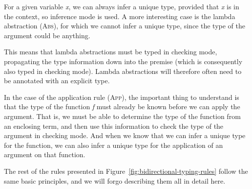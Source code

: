 \begin{figure}
\begin{center}
\usebox{\ptone}
\end{center}
\end{figure}
For a given variable \textit{x}, we can always infer a unique type, provided that \textit{x} is in the context, so inference mode is used. A more interesting case is the lambda abstraction (\textsc{Abs}), for which we cannot infer a unique type, since the type of the argument could be anything.
\begin{figure}
\begin{center}
\usebox{\pttwo}
\end{center}
\end{figure}
This means that lambda abstractions must be typed in checking mode, propagating the type information down into the premise (which is consequently also typed in checking mode). Lambda abstractions will therefore often need to be annotated with an explicit type. 
\begin{figure}
\begin{center}
\usebox{\ptthree}
\end{center}
\end{figure}
In the case of the application rule (\textsc{App}), the important thing to understand is that the type of the function \textit{f} must already be known before we can apply the argument. That is, we must be able to determine the type of the function from an enclosing term, and then use this information to check the type of the argument in checking mode. And when we know that we can infer a unique type for the function, we can also infer a unique type for the application of an argument on that function.

The rest of the rules presented in Figure~\ref{fig:bidirectional-typing-rules} follow the same basic principles, and we will forgo describing them all in detail here. 




\newsavebox{\ptPairElimOne}
\begin{lrbox}{\ptPairElimOne}
\begin{varwidth}{\linewidth}
\begin{prooftree}
\end{prooftree}
\end{varwidth}
\end{lrbox}

